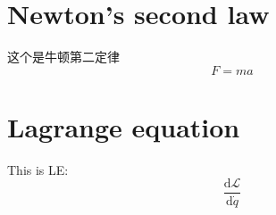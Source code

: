\documentclass{article}
\begin{document}
\section{Newton's second law}
这个是牛顿第二定律
    $$
    F=ma
    $$

\section{Lagrange equation}
This is LE:
$$
\dfrac{\mathrm{d}\mathcal{L}}{\mathrm{d}\dot{q}}
$$
\end{document}
